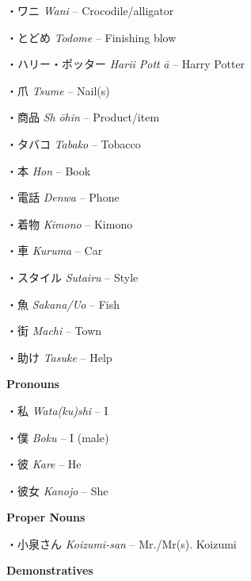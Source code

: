 \par{・ワニ \emph{Wani }– Crocodile\slash alligator }
 
\par{・とどめ \emph{Todome }– Finishing blow }
 
\par{・ハリー・ポッター \emph{Harii Pott }\emph{ā }– Harry Potter }
 
\par{・爪 \emph{Tsume }– Nail(s) }
 
\par{・商品 \emph{Sh }\emph{ōhin }– Product\slash item }
 
\par{・タバコ \emph{Tabako }– Tobacco }
 
\par{・本 \emph{Hon }– Book }
 
\par{・電話 \emph{Denwa }– Phone }
 
\par{・着物 \emph{Kimono }– Kimono }
 
\par{・車 \emph{Kuruma }– Car }
 
\par{・スタイル \emph{Sutairu }– Style }
 
\par{・魚 \emph{Sakana\slash Uo }– Fish }
 
\par{・街 \emph{Machi }– Town }
 
\par{・助け \emph{Tasuke }– Help }
 
\par{\textbf{Pronouns }}
 
\par{・私 \emph{Wata(ku)shi }– I }
 
\par{・僕 \emph{Boku }– I (male) }
 
\par{・彼 \emph{Kare }– He }
 
\par{・彼女 \emph{Kanojo }– She }
 
\par{\textbf{Proper Nouns }}
 
\par{・小泉さん \emph{Koizumi-san }– Mr.\slash Mr(s). Koizumi }
 
\par{\textbf{Demonstratives }}
 
